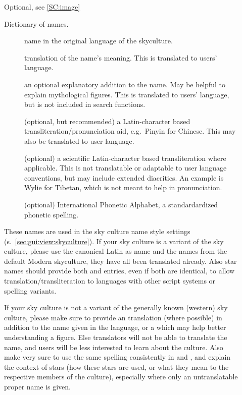 \begin{description}
\item[] Optional, see \ref{SC:image}
\item[] Dictionary of names. %

	\begin{description}
	    \item[] name in the original language of the skyculture. 
	    \item[] translation of the name's meaning. This is translated to users' language.
	    \item[] an optional explanatory addition to the name.   May be helpful to explain mythological figures. 
		This is translated to users' language, but is not included in search functions.
	    \item[] (optional, but recommended) a Latin-character based transliteration/pronunciation aid, e.g.\ Pinyin for Chinese. 
		This may also be translated to user language.
	    \item[] (optional) a scientific Latin-character based transliteration where applicable. 
		This is not translatable or adaptable to user language conventions, but may include extended diacritics. 
		An example is Wylie for Tibetan, which is not meant to help in pronunciation.  
	    \item[] (optional) International Phonetic Alphabet, a standardardized phonetic spelling.
	\end{description}

	These names are used in the sky culture name style settings (s.~\ref{sec:gui:view:skyculture}). 
	If your sky culture is a variant of the  sky culture, 
	please use the canonical Latin as  name and the  names from the default Modern skyculture, they have all been translated already.
	Also star names should provide both  and  entries, even if both are identical, 
	to allow translation/transliteration to languages with other script systems or spelling variants.

	If your sky culture is not a variant of the generally known  (western)
	sky culture, please make sure to provide an  translation (where possible) in addition to the name given in
	the  language, or a  which may help better understanding a figure. Else translators will not be able to translate
	the name, and users will be less interested to learn about the culture. 
	Also make very sure to use the same spelling consistently in  and , 
	and explain the context of stars (how these stars are used, or what they mean to the respective members of the culture), 
	especially where only an untranslatable proper name is given.


\end{description}
